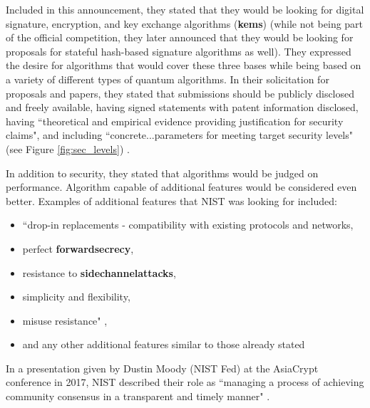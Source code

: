Included in this announcement, they stated that they would be looking for digital signature, encryption, and key exchange algorithms (\textbf{\glspl{kem}}) (while not being part of the official competition, they later announced that they would be looking for proposals for stateful hash-based signature algorithms as well). They expressed the desire for algorithms that would cover these three bases while being based on a variety of different types of quantum algorithms. In their solicitation for proposals and papers, they stated that submissions should be publicly disclosed and freely available, having signed statements with patent information disclosed, having ``theoretical and empirical evidence providing justification for security claims", and including ``concrete...parameters for meeting target security levels" (see Figure \ref{fig:sec_levels}) \cite{moody_ship_sailed}.

In addition to security, they stated that algorithms would be judged on performance. Algorithm capable of additional features would be considered even better. Examples of additional features that NIST was looking for included:
\begin{itemize}
    \item``drop-in replacements - compatibility with existing protocols and networks,
    \item perfect \textbf{\gls{forwardsecrecy}},
    \item resistance to \textbf{\glspl{sidechannelattack}},
    \item simplicity and flexibility,
    \item misuse resistance" \cite{moody_fourth},
    \item and any other additional features similar to those already stated
\end{itemize}

In a presentation given by Dustin Moody (NIST Fed) at the AsiaCrypt conference in 2017, NIST described their role as ``managing a process of achieving community consensus in a transparent and timely manner" \cite{moody_ship_sailed}.

